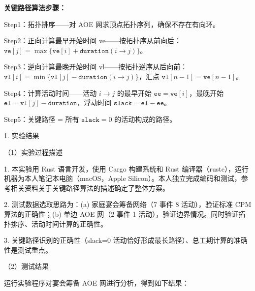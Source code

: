 \noindent\textbf{关键路径算法步骤：}\par
\noindent\hspace*{2em}Step1：拓扑排序——对 AOE 网求顶点拓扑序列，确保不存在有向环。\par
\noindent\hspace*{2em}Step2：正向计算最早开始时间 ve——按拓扑序从前向后：$\texttt{ve}[j] = \max\{\texttt{ve}[i] + \texttt{duration}(i\to j)\}$。\par
\noindent\hspace*{2em}Step3：逆向计算最晚开始时间 vl——按拓扑逆序从后向前：$\texttt{vl}[i] = \min\{\texttt{vl}[j] - \texttt{duration}(i\to j)\}$，汇点 $\texttt{vl}[n-1] = \texttt{ve}[n-1]$。\par
\noindent\hspace*{2em}Step4：计算活动时间——活动 $i\to j$ 的最早开始 $\texttt{ee} = \texttt{ve}[i]$，最晚开始 $\texttt{el} = \texttt{vl}[j] - \texttt{duration}$，浮动时间 $\texttt{slack} = \texttt{el} - \texttt{ee}$。\par
\noindent\hspace*{2em}Step5：关键路径 = 所有 $\texttt{slack} = 0$ 的活动构成的路径。\par

\noindent\hspace*{2em}1. 实验结果\par
\noindent\hspace*{2em}（1）实验过程描述\par
\noindent\hspace*{2em}1. 本实验用 Rust 语言开发，使用 Cargo 构建系统和 Rust 编译器（rustc），运行机器为本人笔记本电脑（macOS，Apple Silicon）。本人独立完成编码和测试，参考相关资料关于关键路径算法的描述确定了整体方案。\par
\noindent\hspace*{2em}2. 测试数据选取思路为：(a) 家庭宴会筹备网络（7 事件 8 活动），验证标准 CPM 算法的正确性；(b) 单边 AOE 网（2 事件 1 活动），验证边界情况。同时验证拓扑排序、活动时间计算的正确性。\par
\noindent\hspace*{2em}3. 关键路径识别的正确性（slack=0 活动恰好形成最长路径）、总工期计算的准确性是测试重点。\par
\noindent\hspace*{2em}（2）测试结果\par
\noindent\hspace*{2em}运行实验程序对宴会筹备 AOE 网进行分析，得到如下结果：\par

